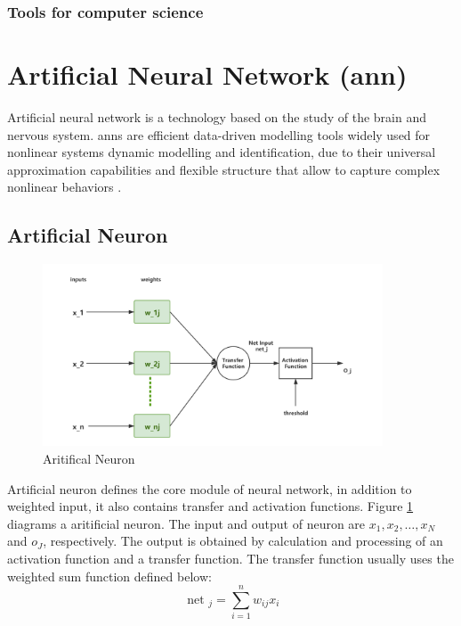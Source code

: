 \subsubsection{Tools for computer science}

\section{Artificial Neural Network (\gls{ann})}
Artificial neural network is a technology based on the study of the brain and nervous system\parencite{WALCZAK2003631}. \gls{ann}s are efficient data-driven modelling tools widely used for nonlinear systems dynamic modelling and identification, due to their universal approximation capabilities and flexible structure that allow to capture complex nonlinear behaviors \parencite{SHOKRY2018265}. 

\subsection{Artificial Neuron}


\begin{figure}[htbp]
\centering
\includegraphics[width=0.9\textwidth]{./images/neuron.png}
\caption{Aritifical Neuron}
\label{fig:neuron}
\end{figure}
Artificial neuron defines the core module of neural network, in addition to weighted input, it also contains transfer and activation functions. Figure \ref{fig:neuron} diagrams a aritificial neuron. The input and output of neuron are $x_1, x_2, \dots, x_N$ and $o_J$, respectively. The output is obtained by calculation and processing of an activation function and a transfer function. The transfer function usually uses the weighted sum function defined below:
\begin{equation}
\text { net }_{j}=\sum_{i=1}^{n} w_{i j} x_{i}
\end{equation}

